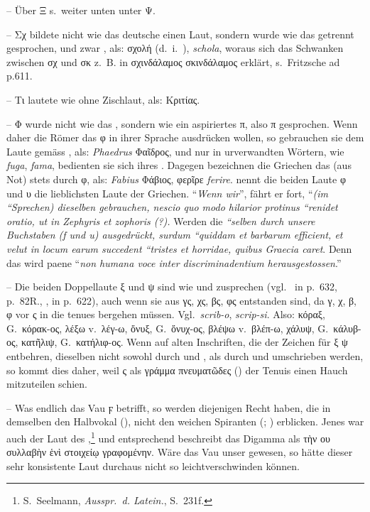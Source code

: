 \noindent -- Über Ξ s.\ weiter unten unter Ψ.

\noindent -- Σχ bildete nicht wie das deutsche  einen
Laut, sondern wurde wie das   getrennt
gesprochen, und zwar ,
als: σχολή (d.~i.~),  \emph{schola}, woraus sich das Schwanken zwischen σχ
und σκ z.~B. in σχινδάλαμος σκινδάλαμος erklärt, s.\ Fritzsche ad
p.611.

\noindent -- Τι lautete wie  ohne Zischlaut, als: Κριτίας.

\noindent -- Φ wurde nicht wie das  , sondern wie ein aspiriertes π, also π gesprochen.
Wenn daher die Römer das φ in ihrer Sprache ausdrücken wollen, so gebrauchen sie
dem Laute gemäss , als: \emph{Phaedrus} Φαῖδρος, und nur in urverwandten
Wörtern, wie \emph{fuga}, \emph{fama}, bedienten sie sich ihres .
Dagegen bezeichnen die Griechen das   (aus Not) stets
durch φ, als: \emph{Fabius} Φάβιος, φερῖρε \emph{ferire}.
 nennt die beiden  Laute φ
und υ die lieblichsten Laute der Griechen.
“\emph{Wenn wir}”, fährt er fort, “\emph{{(im “Sprechen)} dieselben gebrauchen, nescio quo
	modo hilarior protinus “renidet oratio, ut in Zephyris et zophoris (?).}
Werden die \emph{“selben durch unsere Buchstaben (f und u) ausgedrückt, surdum “quiddam
	et barbarum efficient, et velut in locum earum succedent “tristes et
	horridae, quibus Graecia caret}. Denn das  wird paene “\emph{non humana voce inter
	discriminadentium herausgestossen}.”

\noindent -- Die beiden Doppellaute ξ und ψ sind wie 
und  zusprechen (vgl.\  in
 p.\ 632,
 p.\ 82R., , in  p.\ 622), auch wenn
sie aus γς, χς, βς, φς entstanden sind, da γ, χ, β, φ vor ς in die tenues  bergehen müssen.
Vgl.\ \emph{scrib-o}, \emph{scrip-si}. Also: κόραξ, G.\ κόρακ-ος, λέξω v.\
λέγ-ω, ὄνυξ, G.\ ὄνυχ-ος, βλέψω v.\ βλέπ-ω, χάλυψ, G.\ κάλυβ-ος, κατῆλιψ, G.\
κατήλιφ-ος.
Wenn auf alten Inschriften, die der Zeichen für ξ ψ entbehren, dieselben nicht
sowohl durch  und , als durch  und
\epigraphic{ΦΣ} umschrieben werden, so kommt dies
daher, weil ς als γράμμα πνευματῶδες (\passagemb{Cratylus427a}) der Tenuis einen
Hauch mitzuteilen schien.

\noindent {}\label{pvau}-- Was endlich das Vau ϝ betrifft, so werden diejenigen Recht haben, die in
demselben den Halbvokal  (), nicht den weichen
Spiranten \ipa{v}
(\glsxtrshort{engl}; \glsxtrshort{deut} \ipa{w}) erblicken.
Jenes war auch der Laut des  ,\footnote{%
	S.\ Seelmann, \emph{Ausspr.\ d. Latein.}, S.\ 231f.
} und
entsprechend beschreibt
 das  Digamma als τὴν ου συλλαβὴν ἑνὶ στοιχείῳ γραφομένην.
Wäre das Vau unser  gewesen, so hätte dieser sehr konsistente Laut durchaus
nicht so leichtverschwinden können.
